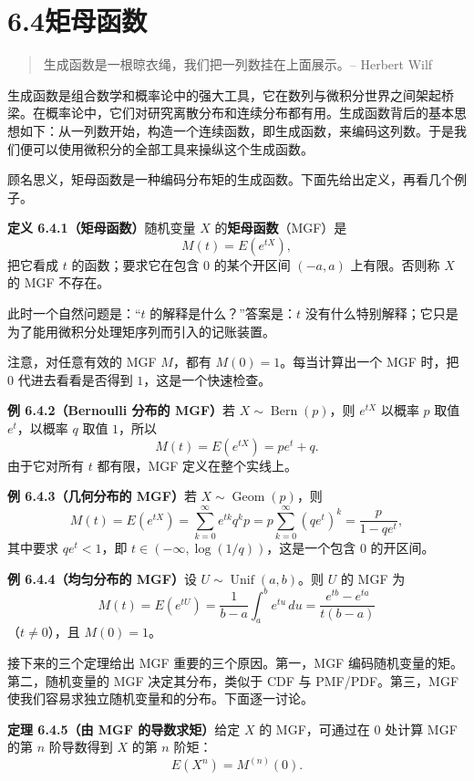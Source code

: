 \documentclass[UTF8,12pt,a4paper,fontset=fandol]{ctexart}
\begin{document}
\section*{6.4\quad 矩母函数}

\begin{quote}
生成函数是一根晾衣绳，我们把一列数挂在上面展示。-- Herbert Wilf
\end{quote}

生成函数是组合数学和概率论中的强大工具，它在数列与微积分世界之间架起桥梁。在概率论中，它们对研究离散分布和连续分布都有用。生成函数背后的基本思想如下：从一列数开始，构造一个连续函数，即生成函数，来编码这列数。于是我们便可以使用微积分的全部工具来操纵这个生成函数。

顾名思义，矩母函数是一种编码分布矩的生成函数。下面先给出定义，再看几个例子。

\noindent\textbf{定义 6.4.1（矩母函数）}\quad 随机变量 $X$ 的\textbf{矩母函数}（MGF）是
\[
  M(t)=E(e^{tX}),
\]
把它看成 $t$ 的函数；要求它在包含 $0$ 的某个开区间 $(-a,a)$ 上有限。否则称 $X$ 的 MGF 不存在。

此时一个自然问题是：“$t$ 的解释是什么？”答案是：$t$ 没有什么特别解释；它只是为了能用微积分处理矩序列而引入的记账装置。

注意，对任意有效的 MGF $M$，都有 $M(0)=1$。每当计算出一个 MGF 时，把 $0$ 代进去看看是否得到 $1$，这是一个快速检查。

\noindent\textbf{例 6.4.2（Bernoulli 分布的 MGF）}\quad 若 $X\sim\operatorname{Bern}(p)$，则 $e^{tX}$ 以概率 $p$ 取值 $e^t$，以概率 $q$ 取值 $1$，所以
\[
  M(t)=E(e^{tX})=pe^t+q.
\]
由于它对所有 $t$ 都有限，MGF 定义在整个实线上。

\noindent\textbf{例 6.4.3（几何分布的 MGF）}\quad 若 $X\sim\operatorname{Geom}(p)$，则
\[
  M(t)=E(e^{tX})
  =
  \sum_{k=0}^{\infty}e^{tk}q^kp
  =
  p\sum_{k=0}^{\infty}(qe^t)^k
  =
  \frac{p}{1-qe^t},
\]
其中要求 $qe^t<1$，即 $t\in(-\infty,\log(1/q))$，这是一个包含 $0$ 的开区间。

\noindent\textbf{例 6.4.4（均匀分布的 MGF）}\quad 设 $U\sim\operatorname{Unif}(a,b)$。则 $U$ 的 MGF 为
\[
  M(t)=E(e^{tU})
  =
  \frac1{b-a}\int_a^b e^{tu}\,du
  =
  \frac{e^{tb}-e^{ta}}{t(b-a)}
\]
（$t\ne0$），且 $M(0)=1$。

接下来的三个定理给出 MGF 重要的三个原因。第一，MGF 编码随机变量的矩。第二，随机变量的 MGF 决定其分布，类似于 CDF 与 PMF/PDF。第三，MGF 使我们容易求独立随机变量和的分布。下面逐一讨论。

\noindent\textbf{定理 6.4.5（由 MGF 的导数求矩）}\quad 给定 $X$ 的 MGF，可通过在 $0$ 处计算 MGF 的第 $n$ 阶导数得到 $X$ 的第 $n$ 阶矩：
\[
  E(X^n)=M^{(n)}(0).
\]
\end{document}
